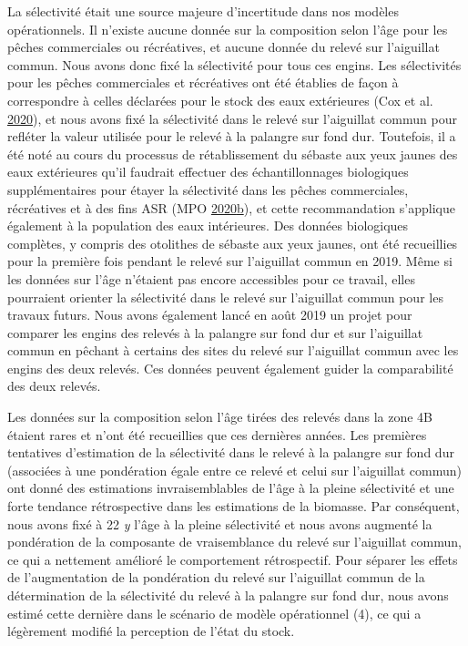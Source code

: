 \documentclass[french,11pt]{book}
\begin{document}
La sélectivité était une source majeure d'incertitude dans nos modèles opérationnels. Il n'existe aucune donnée sur la composition selon l'âge pour les pêches commerciales ou récréatives, et aucune donnée du relevé sur l'aiguillat commun. Nous avons donc fixé la sélectivité pour tous ces engins. Les sélectivités pour les pêches commerciales et récréatives ont été établies de façon à correspondre à celles déclarées pour le stock des eaux extérieures (Cox et al. \protect\hyperlink{ref-cox2020}{2020}), et nous avons fixé la sélectivité dans le relevé sur l'aiguillat commun pour refléter la valeur utilisée pour le relevé à la palangre sur fond dur. Toutefois, il a été noté au cours du processus de rétablissement du sébaste aux yeux jaunes des eaux extérieures qu'il faudrait effectuer des échantillonnages biologiques supplémentaires pour étayer la sélectivité dans les pêches commerciales, récréatives et à des fins ASR (MPO \protect\hyperlink{ref-dfo2020}{2020}\protect\hyperlink{ref-dfo2020}{b}), et cette recommandation s'applique également à la population des eaux intérieures. Des données biologiques complètes, y compris des otolithes de sébaste aux yeux jaunes, ont été recueillies pour la première fois pendant le relevé sur l'aiguillat commun en 2019. Même si les données sur l'âge n'étaient pas encore accessibles pour ce travail, elles pourraient orienter la sélectivité dans le relevé sur l'aiguillat commun pour les travaux futurs. Nous avons également lancé en août 2019 un projet pour comparer les engins des relevés à la palangre sur fond dur et sur l'aiguillat commun en pêchant à certains des sites du relevé sur l'aiguillat commun avec les engins des deux relevés. Ces données peuvent également guider la comparabilité des deux relevés.

Les données sur la composition selon l'âge tirées des relevés dans la zone 4B étaient rares et n'ont été recueillies que ces dernières années. Les premières tentatives d'estimation de la sélectivité dans le relevé à la palangre sur fond dur (associées à une pondération égale entre ce relevé et celui sur l'aiguillat commun) ont donné des estimations invraisemblables de l'âge à la pleine sélectivité et une forte tendance rétrospective dans les estimations de la biomasse. Par conséquent, nous avons fixé à 22 \emph{y} l'âge à la pleine sélectivité et nous avons augmenté la pondération de la composante de vraisemblance du relevé sur l'aiguillat commun, ce qui a nettement amélioré le comportement rétrospectif. Pour séparer les effets de l'augmentation de la pondération du relevé sur l'aiguillat commun de la détermination de la sélectivité du relevé à la palangre sur fond dur, nous avons estimé cette dernière dans le scénario de modèle opérationnel (4), ce qui a légèrement modifié la perception de l'état du stock.
\end{document}

